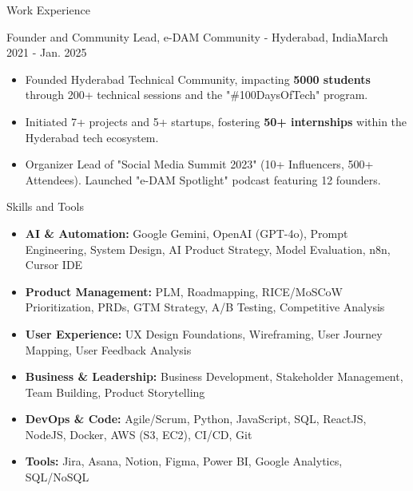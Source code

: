 \documentclass{resume} %
\begin{document}
\begin{rSection}{Work Experience}
\begin{rSubsection}
{Founder and Community Lead, e-DAM Community - Hyderabad, India}{March 2021 - Jan. 2025}{}{}
\begin{itemize}[left=-1.5em, labelsep=.1cm, labelwidth=.2cm, itemsep=0.0em]
\item Founded Hyderabad Technical Community, impacting \textbf{5000 students} through 200+ technical sessions and the "\#100DaysOfTech" program.
\item Initiated 7+ projects and 5+ startups, fostering \textbf{50+ internships} within the Hyderabad tech ecosystem.
\item Organizer Lead of "Social Media Summit 2023" (10+ Influencers, 500+ Attendees). Launched "e-DAM Spotlight" podcast featuring 12 founders.
\end{itemize}
\end{rSubsection}

\end{rSection}

\begin{rSection}{Skills and Tools}
\begin{itemize}[left=-1.5em, labelsep=.1cm, labelwidth=.2cm, itemsep=0.0em]
    \item \textbf{AI \& Automation:} Google Gemini, OpenAI (GPT-4o), Prompt Engineering, System Design, AI Product Strategy, Model Evaluation, n8n, Cursor IDE
    \item \textbf{Product Management:} PLM, Roadmapping, RICE/MoSCoW Prioritization, PRDs, GTM Strategy, A/B Testing, Competitive Analysis
    \item \textbf{User Experience:} UX Design Foundations, Wireframing, User Journey Mapping, User Feedback Analysis
    \item \textbf{Business \& Leadership:} Business Development, Stakeholder Management, Team Building, Product Storytelling
    \item \textbf{DevOps & Code:} Agile/Scrum, Python, JavaScript, SQL, ReactJS, NodeJS, Docker, AWS (S3, EC2), CI/CD, Git
    \item \textbf{Tools:} Jira, Asana, Notion, Figma, Power BI, Google Analytics, SQL/NoSQL
\end{itemize}
\end{rSection}
\end{document}
